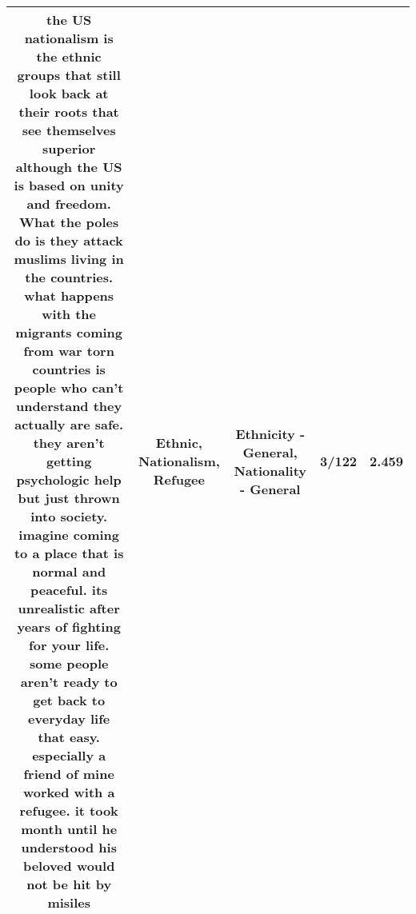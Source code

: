 \documentclass[11pt]{article}
\newlength\mylength
\begin{document}
\begin{center}
\begin{longtable}{|C{.65\mylength}|C{.30\mylength}|C{.12\mylength}|C{.12\mylength}|C{.12\mylength}|}
  \small the US \textbf{nationalism} is the \textbf{ethnic} groups that still look back at their roots that see themselves superior although the US is based on unity and freedom. What the poles do is they attack muslims living in the countries. what happens with the migrants coming from war torn countries is people who can't understand they actually are safe. they aren't getting psychologic help but just thrown into society. imagine coming to a place that is normal and peaceful. its unrealistic after years of fighting for your life. some people aren't ready to get back to everyday life that easy. especially a friend of mine worked with a \textbf{refugee}. it took month until he understood his beloved would not be hit by misiles\normalsize   & Ethnic, Nationalism, Refugee & Ethnicity - General, Nationality - General & 3/122 & 2.459 \\  \hline

\end{longtable}
\end{center}
\end{document}
